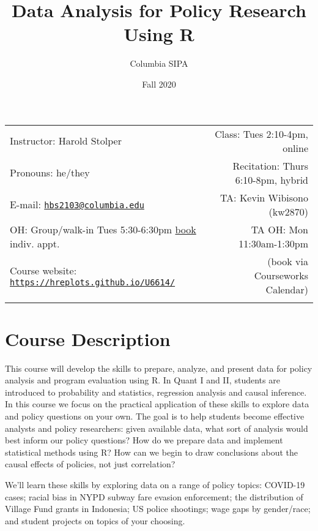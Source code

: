 \documentclass[11pt,]{article}
\title{Data Analysis for Policy Research Using R}
\author{Columbia \textbar{} SIPA}
\date{Fall 2020}
\begin{document}
  

		\maketitle
		
	
		\thispagestyle{firststyle}



	\noindent \begin{tabular*}{\textwidth}{ @{\extracolsep{\fill}} lr @{\extracolsep{\fill}}}

Instructor: Harold Stolper & Class: Tues 2:10-4pm, online\\
Pronouns: he/they & Recitation: Thurs 6:10-8pm, hybrid\\
E-mail: \texttt{\href{mailto:hbs2103@columbia.edu}{\nolinkurl{hbs2103@columbia.edu}}} & TA: Kevin
Wibisono (kw2870)\\
OH: Group/walk-in Tues 5:30-6:30pm \textbar{}
\href{https://helloharold.youcanbook.me}{book} indiv.
appt.  &  TA OH: Mon 11:30am-1:30pm\\
Course website: \texttt{\url{https://hreplots.github.io/U6614/}} & (book via Courseworks Calendar)\\
	&  \\
	\hline
	\end{tabular*}
	
\vspace{2mm}
	


\hypertarget{course-description}{%
\section{Course Description}\label{course-description}}

This course will develop the skills to prepare, analyze, and present
data for policy analysis and program evaluation using R. In Quant I and
II, students are introduced to probability and statistics, regression
analysis and causal inference. In this course we focus on the practical
application of these skills to explore data and policy questions on your
own. The goal is to help students become effective analysts and policy
researchers: given available data, what sort of analysis would best
inform our policy questions? How do we prepare data and implement
statistical methods using R? How can we begin to draw conclusions about
the causal effects of policies, not just correlation?

We'll learn these skills by exploring data on a range of policy topics:
COVID-19 cases; racial bias in NYPD subway fare evasion enforcement; the
distribution of Village Fund grants in Indonesia; US police shootings;
wage gaps by gender/race; and student projects on topics of your
choosing.
\end{document}
